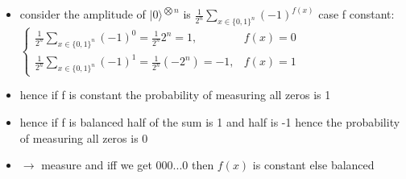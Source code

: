 \documentclass[12pt,a4paper]{article}
\newcommand{\ecb}[1]{\{#1\}}
\newcommand{\ket}[1]{\vert #1 \rangle}
\begin{document}
\begin{itemize}
\begin{itemize}
\item consider the amplitude of $\ket{0}^{\bigotimes n}$ is $\displaystyle \frac{1}{2^n} \sum_{x\in\ecb{0,1}^n} (-1)^{f(x)}$
case f constant: $\displaystyle \begin{cases} \frac{1}{2^n} \sum_{x\in\ecb{0,1}^n} (-1)^0 = \frac{1}{2^n} 2^n = 1, & f(x) = 0\\\frac{1}{2^n} \sum_{x\in\ecb{0,1}^n} (-1)^1 = \frac{1}{2^n} (-2^n) = -1, & f(x)=1 \end{cases}$
\item hence if f is constant the probability of measuring all zeros is 1
\item hence if f is balanced half of the sum is 1 and half is -1 hence the probability of measuring all zeros is 0
\item $\rightarrow$ measure and iff we get 000...0 then $f(x)$ is constant else balanced
\end{itemize}
\end{itemize}
\end{document}

